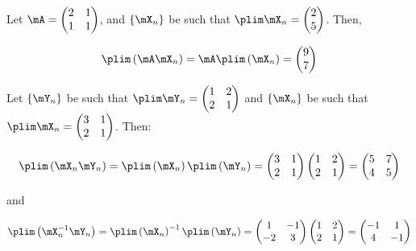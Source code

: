 \documentclass[english,12pt]{book}\usepackage[]{graphicx}\usepackage[]{xcolor}
\begin{document}
\begin{example}
Let $\mA = \begin{pmatrix} 2 & 1 \\ 1 & 1 \end{pmatrix}$, and $\left\lbrace \mX_n \right\rbrace$ be such that $\plim \mX_n = \begin{pmatrix} 2 \\ 5 \end{pmatrix}$. Then, 

\begin{equation*}
  \plim\left(\mA\mX_n\right) = \mA\plim\left(\mX_n\right) = \begin{pmatrix} 9 \\ 7 \end{pmatrix}
\end{equation*}
\end{example}

\begin{example}
Let $\left\lbrace \mY_n \right\rbrace$ be such that $\plim \mY_n = \begin{pmatrix} 1 & 2 \\ 2 & 1 \end{pmatrix}$ and $\left\lbrace \mX_n \right\rbrace$ be such that $\plim \mX_n = \begin{pmatrix} 3 & 1 \\ 2 & 1 \end{pmatrix}$. Then:

\begin{equation*}
\plim \left(\mX_n\mY_n\right) = \plim\left(\mX_n\right)\plim \left(\mY_n\right) = \begin{pmatrix} 3 & 1 \\ 2 & 1 \end{pmatrix}\begin{pmatrix} 1 & 2 \\ 2 & 1 \end{pmatrix} =  \begin{pmatrix} 5 & 7 \\ 4 & 5 \end{pmatrix}
\end{equation*}

and

\begin{equation*}
\plim \left(\mX_n^{-1}\mY_n\right) = \plim\left(\mX_n\right)^{-1}\plim \left(\mY_n\right) = \begin{pmatrix} 1 & -1 \\ -2 & 3 \end{pmatrix}\begin{pmatrix} 1 & 2 \\ 2 & 1 \end{pmatrix} =  \begin{pmatrix} -1 & 1 \\ 4 & -1 \end{pmatrix}
\end{equation*}
\end{example}
\end{document}
